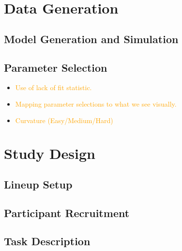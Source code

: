 \documentclass[]{interact}
\theoremstyle{plain}%
\theoremstyle{definition}
\theoremstyle{remark}
\begin{document}
\citet{buja_statistical_2009}

\hypertarget{data-generation}{%
\section{Data Generation}\label{data-generation}}

\hypertarget{model-generation-and-simulation}{%
\subsection{Model Generation and
Simulation}\label{model-generation-and-simulation}}

\hypertarget{parameter-selection}{%
\subsection{Parameter Selection}\label{parameter-selection}}

\begin{itemize}
\item
  \textcolor{Orange}{Use of lack of fit statistic.}
\item
  \textcolor{Orange}{Mapping parameter selections to what we see visually.}
\item
  \textcolor{Orange}{Curvature (Easy/Medium/Hard)}
\end{itemize}

\hypertarget{study-design}{%
\section{Study Design}\label{study-design}}

\hypertarget{lineup-setup}{%
\subsection{Lineup Setup}\label{lineup-setup}}

\hypertarget{participant-recruitment}{%
\subsection{Participant Recruitment}\label{participant-recruitment}}

\hypertarget{task-description}{%
\subsection{Task Description}\label{task-description}}
\end{document}
